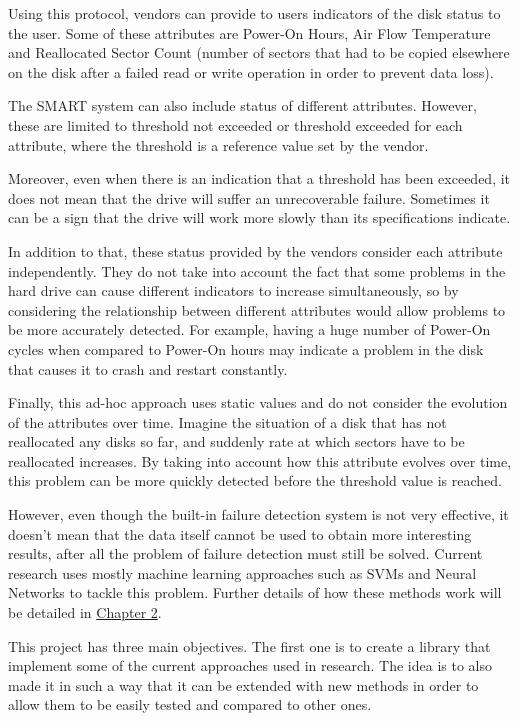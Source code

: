 Using this protocol, vendors can provide to users indicators of the disk status to the user.
Some of these attributes are Power-On Hours, Air Flow Temperature and Reallocated Sector Count (number of sectors that had to be copied elsewhere on the disk after a failed read or write operation in order to prevent data loss)\cite{SamsungSSD}.

The SMART system can also include status of different attributes.
However, these are limited to threshold not exceeded or threshold exceeded for each attribute, where the threshold is a reference value set by the vendor\cite{SamsungSSD}.

Moreover, even when there is an indication that a threshold has been exceeded, it does not mean that the drive will suffer an unrecoverable failure.
Sometimes it can be a sign that the drive will work more slowly than its specifications indicate.

In addition to that, these status provided by the vendors consider each attribute independently.
They do not take into account the fact that some problems in the hard drive can cause different indicators to increase simultaneously, so by considering the relationship between different attributes would allow problems to be more accurately detected.
For example, having a huge number of Power-On cycles when compared to Power-On hours may indicate a problem in the disk that causes it to crash and restart constantly.

Finally, this ad-hoc approach uses static values and do not consider the evolution of the attributes over time.
Imagine the situation of a disk that has not reallocated any disks so far, and suddenly rate at which sectors have to be reallocated increases.
By taking into account how this attribute evolves over time, this problem can be more quickly detected before the threshold value is reached.

However, even though the built-in failure detection system is not very effective, it doesn't mean that the data itself cannot be used to obtain more interesting results, after all the problem of failure detection must still be solved.
Current research uses mostly machine learning approaches such as SVMs and Neural Networks to tackle this problem.
Further details of how these methods work will be detailed in \hyperref[chap:background]{Chapter 2}. 

This project has three main objectives.
The first one is to create a library that implement some of the current approaches used in research.
The idea is to also made it in such a way that it can be extended with new methods in order to allow them to be easily tested and compared to other ones. 

